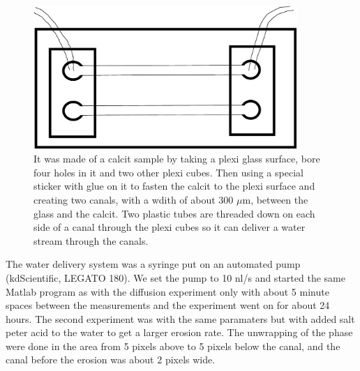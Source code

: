 \begin {figure}[ht!]
\includegraphics [width=10cm]{bilder/calcitsample.pdf}
\caption {%
It was made of a calcit sample by taking a plexi glass surface, bore four holes
in it and two other plexi cubes. Then using a special sticker with glue on it to
fasten the calcit to the plexi surface and creating two canals, with a wdith of about
300 $\mu$m, between the glass and the calcit. Two plastic tubes are threaded down 
on each side of a canal through the plexi cubes so it can deliver a water stream 
through the canals.}
\end {figure}

The water delivery system was a syringe put on an automated pump 
(kdScientific, LEGATO 180). 
We set the pump to 10 nl/s and started the same Matlab program as with the diffusion
experiment only with about 5 minute spaces between the measurements and the experiment
went on for about 24 hours. The second experiment was with the same paramaters but with 
added salt peter acid to the water to get a larger erosion rate. The unwrapping of
the phase were done in the area from 5 pixels above to 5 pixels below the canal, 
and the canal before the erosion was about 2 pixels wide.

%
